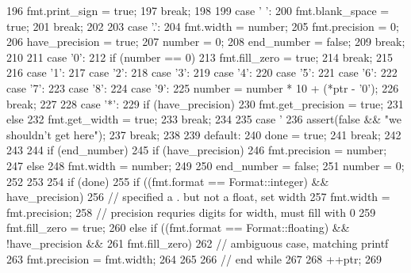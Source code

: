 \begin{DoxyCode}
{{{196             fmt.print_sign = true;
197             break;
198 
199           case ' ':
200             fmt.blank_space = true;
201             break;
202 
203           case '.':
204             fmt.width = number;
205             fmt.precision = 0;
206             have_precision = true;
207             number = 0;
208             end_number = false;
209             break;
210 
211           case '0':
212             if (number == 0) {
213                 fmt.fill_zero = true;
214                 break;
215             }
216           case '1':
217           case '2':
218           case '3':
219           case '4':
220           case '5':
221           case '6':
222           case '7':
223           case '8':
224           case '9':
225             number = number * 10 + (*ptr - '0');
226             break;
227 
228           case '*':
229             if (have_precision)
230                 fmt.get_precision = true;
231             else
232                 fmt.get_width = true;
233             break;
234 
235           case '%
236             assert(false && "we shouldn't get here");
237             break;
238 
239           default:
240             done = true;
241             break;
242         }
243 
244         if (end_number) {
245             if (have_precision)
246                 fmt.precision = number;
247             else
248                 fmt.width = number;
249 
250             end_number = false;
251             number = 0;
252         }
253 
254         if (done) {
255             if ((fmt.format == Format::integer) && have_precision) {
256                 // specified a . but not a float, set width
257                 fmt.width = fmt.precision;
258                 // precision requries digits for width, must fill with 0
259                 fmt.fill_zero = true;
260             } else if ((fmt.format == Format::floating) && !have_precision &&
261                         fmt.fill_zero) {
262                 // ambiguous case, matching printf
263                 fmt.precision = fmt.width;
264             }
265         }
266     } // end while
267 
268     ++ptr;
269 }
\end{DoxyCode}


